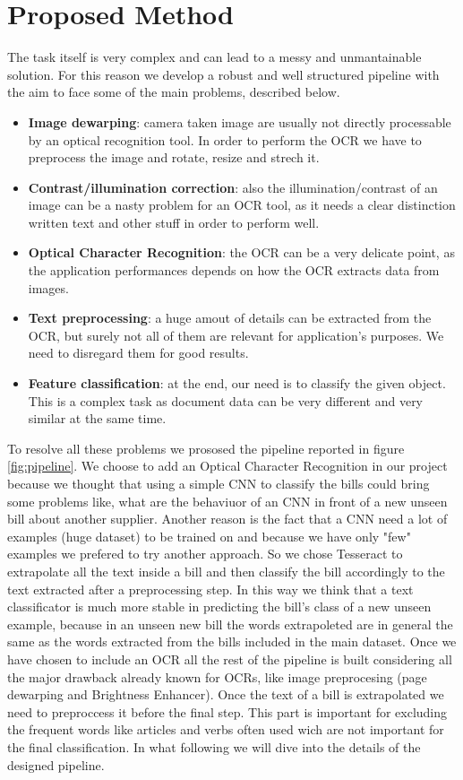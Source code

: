 \documentclass[10pt,twocolumn,letterpaper]{article}
\begin{document}
\section{Proposed Method}
\label{sec:proposed-method}

The task itself is very complex and can lead to a messy and
unmantainable solution. For this reason we develop a robust and well
structured pipeline with the aim to face some of the main problems,
described below.

\begin{itemize}
  \item \textbf{Image dewarping}: camera taken image are usually not directly
    processable by an optical recognition tool. In order to perform
    the OCR we have to preprocess the image and rotate, resize and
    strech it.
  \item \textbf{Contrast/illumination correction}: also the
    illumination/contrast of an image can be a nasty problem for an
    OCR tool, as it needs a clear distinction written text and other
    stuff in order to perform well.
  \item \textbf{Optical Character Recognition}: the OCR can be a very delicate
    point, as the application performances depends on how the OCR
    extracts data from images.
  \item \textbf{Text preprocessing}: a huge amout of details can be extracted
    from the OCR, but surely not all of them are relevant for
    application's purposes. We need to disregard them for good results.
  \item \textbf{Feature classification}: at the end, our need is to classify
    the given object. This is a complex task as document data can be
    very different and very similar at the same time.
\end{itemize}

To resolve all these problems we prososed the pipeline reported in
figure \ref{fig:pipeline}. We choose to add an Optical Character
Recognition in our project because we thought that using a simple CNN
to classify the bills could bring some problems like, what are the
behaviuor of an CNN in front of a new unseen bill about another
supplier. Another reason is the fact that a CNN need a lot of examples
(huge dataset) to be trained on and because we have only "few"
examples we prefered to try another approach. So we chose Tesseract to
extrapolate all the text inside a bill and then classify the bill
accordingly to the text extracted after a preprocessing step. In this
way we think that a text classificator is much more stable in
predicting the bill's class of a new unseen example, because in an
unseen new bill the words extrapoleted are in general the same as the
words extracted from the bills included in the main dataset. Once we
have chosen to include an OCR all the rest of the pipeline is built
considering all the major drawback already known for OCRs, like image
preprocesing (page dewarping and Brightness Enhancer). Once the text
of a bill is extrapolated we need to preproccess it before the final
step. This part is important for excluding the frequent words like
articles and verbs often used wich are not important for the final
classification. In what following we will dive into the details of the
designed pipeline.
\end{document}
